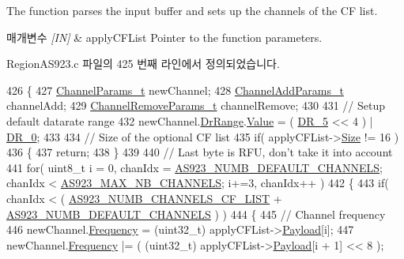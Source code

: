 The function parses the input buffer and sets up the channels of the CF list. 


\begin{DoxyParams}{매개변수}
{\em \mbox{[}\+I\+N\mbox{]}} & apply\+C\+F\+List Pointer to the function parameters. \\
\hline
\end{DoxyParams}


Region\+A\+S923.\+c 파일의 425 번째 라인에서 정의되었습니다.


\begin{DoxyCode}
426 \{
427     \mbox{\hyperlink{structs_channel_params}{ChannelParams\_t}} newChannel;
428     \mbox{\hyperlink{structs_channel_add_params}{ChannelAddParams\_t}} channelAdd;
429     \mbox{\hyperlink{structs_channel_remove_params}{ChannelRemoveParams\_t}} channelRemove;
430 
431     \textcolor{comment}{// Setup default datarate range}
432     newChannel.\mbox{\hyperlink{structs_channel_params_ad4d9b041ea740886a05fa8a1d06997a2}{DrRange}}.\mbox{\hyperlink{unionu_dr_range_ae1e3e8696366e3256e397bbdc4e34775}{Value}} = ( \mbox{\hyperlink{group___r_e_g_i_o_n_ga872e12c82020c02a7f70a1c6ed1375df}{DR\_5}} << 4 ) | \mbox{\hyperlink{group___r_e_g_i_o_n_ga6c4ef966b4f3d5eb7597b087f2b97095}{DR\_0}};
433 
434     \textcolor{comment}{// Size of the optional CF list}
435     \textcolor{keywordflow}{if}( applyCFList->\mbox{\hyperlink{structs_apply_c_f_list_params_ace31de7598e85e87624c4e7d8e5d112c}{Size}} != 16 )
436     \{
437         \textcolor{keywordflow}{return};
438     \}
439 
440     \textcolor{comment}{// Last byte is RFU, don't take it into account}
441     \textcolor{keywordflow}{for}( uint8\_t i = 0, chanIdx = \mbox{\hyperlink{group___r_e_g_i_o_n_a_s923_ga189fa7f36943ed53424ac7610ef64d56}{AS923\_NUMB\_DEFAULT\_CHANNELS}}; chanIdx < 
      \mbox{\hyperlink{group___r_e_g_i_o_n_a_s923_ga02e3db7e4557dbf77db79285d38dc33e}{AS923\_MAX\_NB\_CHANNELS}}; i+=3, chanIdx++ )
442     \{
443         \textcolor{keywordflow}{if}( chanIdx < ( \mbox{\hyperlink{group___r_e_g_i_o_n_a_s923_gaeb64b3a7da759d5e403f08bbacdb8cf8}{AS923\_NUMB\_CHANNELS\_CF\_LIST}} + 
      \mbox{\hyperlink{group___r_e_g_i_o_n_a_s923_ga189fa7f36943ed53424ac7610ef64d56}{AS923\_NUMB\_DEFAULT\_CHANNELS}} ) )
444         \{
445             \textcolor{comment}{// Channel frequency}
446             newChannel.\mbox{\hyperlink{structs_channel_params_ade3d190636488dad9a89b19446b7acf1}{Frequency}} = (uint32\_t) applyCFList->\mbox{\hyperlink{structs_apply_c_f_list_params_a3dfbfe76c8f3bd25765750487b815147}{Payload}}[i];
447             newChannel.\mbox{\hyperlink{structs_channel_params_ade3d190636488dad9a89b19446b7acf1}{Frequency}} |= ( (uint32\_t) applyCFList->\mbox{\hyperlink{structs_apply_c_f_list_params_a3dfbfe76c8f3bd25765750487b815147}{Payload}}[i + 1] << 8 );

\end{DoxyCode}
